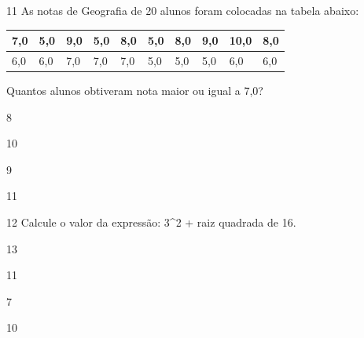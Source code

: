 
\num{11} As notas de Geografia de 20 alunos foram colocadas na tabela abaixo:


\begin{longtable}[]{@{}llllllllll@{}}
\toprule
7,0 & 5,0 & 9,0 & 5,0 & 8,0 & 5,0 & 8,0 & 9,0 & 10,0 &
8,0\tabularnewline
\midrule
\endhead
6,0 & 6,0 & 7,0 & 7,0 & 7,0 & 5,0 & 5,0 & 5,0 & 6,0 & 6,0\tabularnewline
\bottomrule
\end{longtable}

Quantos alunos obtiveram nota maior ou igual a 7,0?
\item 8
\item 10
\item 9
\item 11







\num{12} Calcule o valor da expressão: 3^2 + raiz quadrada de 16.
\item 13
\item 11
\item 7
\item 10


